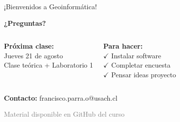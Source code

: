 \documentclass[10pt]{beamer}
\begin{document}
\begin{frame}{¡Bienvenidos a Geoinformática!}
    \begin{center}
        \Large{\textbf{¿Preguntas?}}
        
        \vspace{1cm}
        
        \begin{columns}
            \begin{center}
                \textcolor{usachblue}{ \textbf{Próxima clase:}}\\
                Jueves 21 de agosto\\
                Clase teórica + Laboratorio 1
            \end{center}
            
            \begin{center}
                \textcolor{usachred}{ \textbf{Para hacer:}}\\
                $\checkmark$ Instalar software\\
                $\checkmark$ Completar encuesta\\
                $\checkmark$ Pensar ideas proyecto
            \end{center}
        \end{columns}
        
        \vspace{1cm}
        
        \textbf{Contacto:} francisco.parra.o@usach.cl
        
        \vspace{0.5cm}
        
        \textcolor{gray}{\small Material disponible en GitHub del curso}
    \end{center}
\end{frame}
\end{document}

